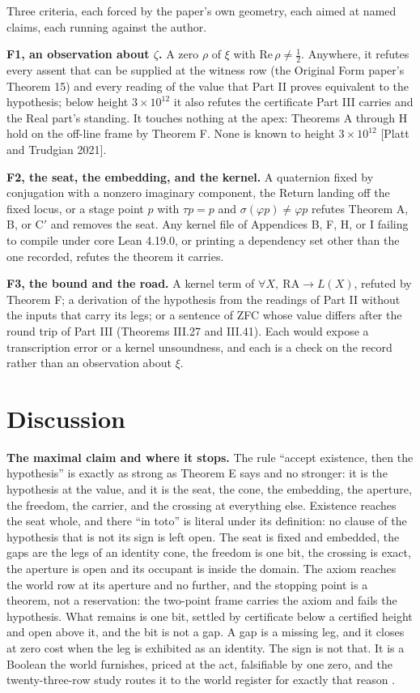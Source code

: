 \documentclass[10pt,twocolumn]{article}
\begin{document}
Three criteria, each forced by the paper's own geometry, each aimed at
named claims, each running against the author.

\textbf{F1, an observation about \(\zeta\).} A zero \(\rho\) of \(\xi\)
with \(\mathrm{Re}\,\rho \neq \tfrac12\). Anywhere, it refutes every
assent that can be supplied at the witness row (the Original Form
paper's Theorem 15) and every reading of the value that Part II proves
equivalent to the hypothesis; below height \(3 \times 10^{12}\) it also
refutes the certificate Part III carries and the Real part's standing.
It touches nothing at the apex: Theorems A through H hold on the
off-line frame by Theorem F. None is known to height
\(3 \times 10^{12}\) {[}Platt and Trudgian 2021{]}.

\textbf{F2, the seat, the embedding, and the kernel.} A quaternion fixed
by conjugation with a nonzero imaginary component, the Return landing
off the fixed locus, or a stage point \(p\) with \(\tau p = p\) and
\(\sigma(\varphi p) \neq \varphi p\) refutes Theorem A, B, or C\('\) and
removes the seat. Any kernel file of Appendices B, F, H, or I failing to
compile under core Lean 4.19.0, or printing a dependency set other than
the one recorded, refutes the theorem it carries.

\textbf{F3, the bound and the road.} A kernel term of
\(\forall X,\ \mathrm{RA} \to L(X)\), refuted by Theorem F; a derivation
of the hypothesis from the readings of Part II without the inputs that
carry its legs; or a sentence of ZFC whose value differs after the round
trip of Part III (Theorems III.27 and III.41). Each would expose a
transcription error or a kernel unsoundness, and each is a check on the
record rather than an observation about \(\xi\).

\hypertarget{discussion}{%
\section{Discussion}\label{discussion}}

\textbf{The maximal claim and where it stops.} The rule ``accept
existence, then the hypothesis'' is exactly as strong as Theorem E says
and no stronger: it is the hypothesis at the value, and it is the seat,
the cone, the embedding, the aperture, the freedom, the carrier, and the
crossing at everything else. Existence reaches the seat whole, and there
``in toto'' is literal under its definition: no clause of the hypothesis
that is not its sign is left open. The seat is fixed and embedded, the
gaps are the legs of an identity cone, the freedom is one bit, the
crossing is exact, the aperture is open and its occupant is inside the
domain. The axiom reaches the world row at its aperture and no further,
and the stopping point is a theorem, not a reservation: the two-point
frame carries the axiom and fails the hypothesis. What remains is one
bit, settled by certificate below a certified height and open above it,
and the bit is not a gap. A gap is a missing leg, and it closes at zero
cost when the leg is exhibited as an identity. The sign is not that. It
is a Boolean the world furnishes, priced at the act, falsifiable by one
zero, and the twenty-three-row study routes it to the world register for
exactly that reason \cite{islamrows}.
\end{document}
